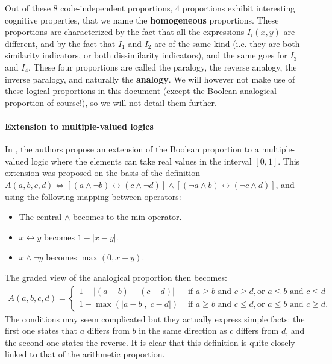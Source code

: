 Out of these $8$ code-independent proportions, $4$ proportions exhibit
interesting cognitive properties, that we name the \textbf{homogeneous}
proportions. These proportions are characterized by the fact that all the
expressions $I_i(x, y)$ are different, and by the fact that $I_1$ and $I_2$ are
of the same kind (i.e. they are both similarity indicators, or both
dissimilarity indicators), and the same goes for $I_3$ and $I_4$. These four
proportions are called the paralogy, the reverse analogy, the inverse paralogy,
and naturally the \textbf{analogy}. We will however not make use of these
logical proportions in this document (except the Boolean analogical proportion of
course!), so we will not detail them further.

\paragraph{Extension to multiple-valued logics\\}

In \cite{PraRic13}, the authors propose an extension of the Boolean proportion
to a multiple-valued logic where the elements can take real values in the
interval $[0, 1]$.  This extension was proposed on the basis of the definition
$A(a, b, c, d) \iff \left[(a \wedge \neg b) \leftrightarrow (c \wedge \neg
d)\right]  \wedge \left[(\neg a \wedge b)\leftrightarrow (\neg c \wedge
d)\right]$, and using the following mapping between operators:
\begin{itemize}
  \item The central $\wedge$ becomes to the min operator.
  \item $x \leftrightarrow y$ becomes $1 - |x - y|$.
  \item $x \wedge \neg y$ becomes $\max(0, x-y)$.
\end{itemize}
The graded view of the analogical proportion then becomes:
\begin{align*}
A(a, b, c, d) =
\begin{cases}
  1 - |(a - b) - (c - d)| &\text{ if } a \geq b \text { and } c \geq d, \text{
    or } a \leq b \text{ and } c \leq d\\
  1 - \max(|a - b|, |c - d|) &\text{ if } a \geq b \text { and } c \leq d, \text{
    or } a \leq b \text{ and } c \geq d.
\end{cases}
\end{align*}
The conditions may seem complicated but they actually express simple facts: the
first one states that $a$ differs from $b$ in the same direction as $c$ differs
from $d$, and the second one states the reverse. It is clear that this
definition is quite closely linked to that of the arithmetic proportion.

